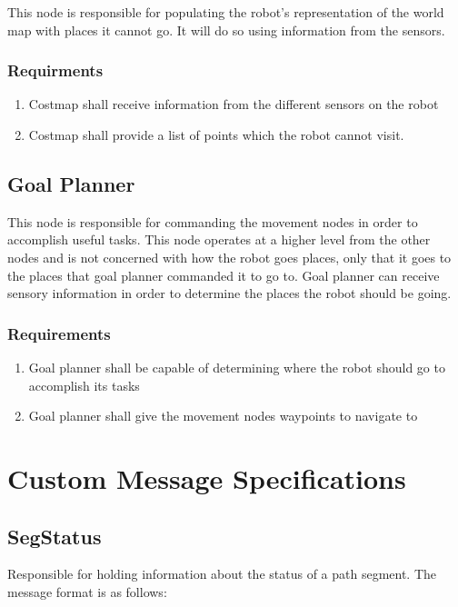 This node is responsible for populating the robot's representation of the world map with places it cannot go. It will do so using information from the sensors.

  \subsubsection{Requirments}
  \begin{enumerate}
    \item Costmap shall receive information from the different sensors on the robot
    \item Costmap shall provide a list of points which the robot cannot visit.
  \end{enumerate}
       
\subsection{Goal Planner}

This node is responsible for commanding the movement nodes in order to accomplish useful tasks. This node operates at a higher level from the other nodes and is not concerned with how the robot goes places, only that it goes to the places that goal planner commanded it to go to. Goal planner can receive sensory information in order to determine the places the robot should be going.

  \subsubsection{Requirements}
  \begin{enumerate}
    \item Goal planner shall be capable of determining where the robot should go to accomplish its tasks
    \item Goal planner shall give the movement nodes waypoints to navigate to
  \end{enumerate}

\section{Custom Message Specifications}

\subsection{SegStatus}

Responsible for holding information about the status of a path
segment.  The message format is as follows:

